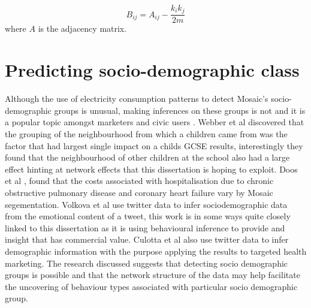 \begin{equation}
\label{eq:mod2}
    B_{ij}=A_{ij}-\frac{k_i k_j}{2m}
\end{equation}
where $A$ is the adjacency matrix.


\section{Predicting socio-demographic class}

Although the use of electricity consumption patterns to detect Mosaic's socio-demographic groups is unusual, making inferences on these groups is not and it is a popular topic amongst marketers \cite{leventhal2016} and civic users \cite{generatingaleedsgeodemographicclassificationapplicationsinpolicycommerceandhealthearthandenvironment2016} \cite{limited2015}. Webber et al \cite{webber2007} discovered that the grouping of the neighbourhood from which a children came from was the factor that had largest single impact on a childs GCSE results, interestingly they found that the neighbourhood of other children at the school also had a large effect hinting at network effects that this dissertation is hoping to exploit. Doos et al \cite{doos2013}, found that the costs associated with hospitalisation due to chronic obstructive pulmonary disease and coronary heart failure vary by Mosaic segementation. Volkova et al \cite{volkova2015} use twitter data to infer sociodemographic data from the emotional content of a tweet, this work is in some ways quite closely linked to this dissertation as it is using behavioural inference to provide and insight that has commercial value. Culotta et al \cite{culotta2015} also use twitter data to infer demographic information with the purpose applying the results to targeted health marketing. The research discussed suggests that detecting socio demographic groups is possible and that the network structure of the data may help facilitate the uncovering of behaviour types associated with particular socio demographic group.

